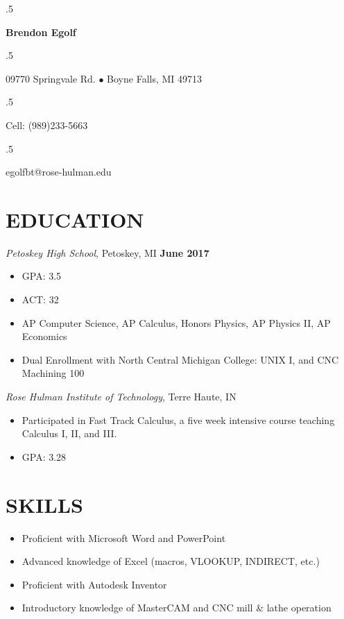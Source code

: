 \documentclass[margin, line]{res}
\begin{document}
 \moveleft.5\hoffset\centerline{\large\bf Brendon Egolf}
 \moveleft.5\hoffset\centerline{09770 Springvale Rd. $\bullet$ Boyne Falls, MI 49713}
 \moveleft.5\hoffset\centerline{Cell: (989)233-5663}
 \moveleft.5\hoffset\centerline{egolfbt@rose-hulman.edu}


\begin{resume}
\noindent

  \section{EDUCATION} {\sl Petoskey High School}, Petoskey, MI \hfill \textbf{June 2017} \\
                \begin{itemize}
                    \item GPA: 3.5
                    \item ACT: 32
                    \item AP Computer Science, AP Calculus, Honors Physics, AP Physics II, AP
                    Economics
                    \item Dual Enrollment with North Central Michigan College: UNIX I,
                      and CNC Machining 100
                \end{itemize}

{\sl Rose Hulman Institute of Technology}, Terre Haute, IN \\
                \begin{itemize}
                  \item Participated in Fast Track Calculus, a five week intensive
                    course teaching Calculus I, II, and III.
                  \item GPA: 3.28
                \end{itemize}

\section{SKILLS}
  \begin{itemize}
    \item Proficient with Microsoft Word and PowerPoint
    \item Advanced knowledge of Excel (macros, VLOOKUP, INDIRECT, etc.)
    \item Proficient with Autodesk Inventor
    \item Introductory knowledge of MasterCAM and CNC mill \& lathe operation
  \end{itemize}


\end{resume}
\end{document}
